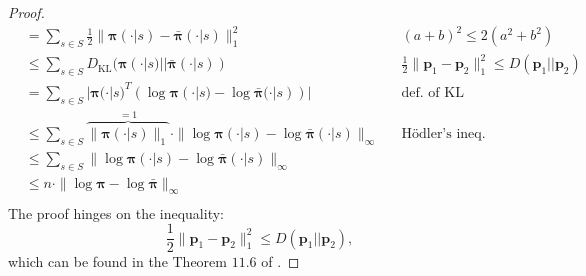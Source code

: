 \begin{claim}
\begin{proof}
\begin{align*}
            & = \sum_{s\in S} \frac{1}{2} \| \bm{\pi} (\cdot|s) 
            - \bar{\bm{\pi}} (\cdot|s) \|_1^2 
            && (a+b)^2 \leq 2(a^2+b^2) \\
            & \leq \sum_{s\in S} D_\text{KL}( \bm{\pi} (\cdot|s) 
            || \bar{\bm{\pi}} (\cdot|s) )
            && \frac{1}{2} \|\bm{p}_1 - \bm{p}_2 \|_1^2 \leq D(\bm{p}_1||\bm{p}_2) \\
            & = \sum_{s\in S} | \bm{\pi}(\cdot|s)^T (  \log \bm{\pi}(\cdot|s) - \log \bar{\bm{\pi}}(\cdot|s) )  |
            && \text{def. of KL}\\
            & \leq \sum_{s\in S} 
            \overbrace{\| \bm{\pi} (\cdot|s) \|_1 }^{=1}
            \cdot \|  \log \bm{\pi} (\cdot|s) - \log \bar{\bm{\pi}} (\cdot|s) \|_\infty  
            && \text{Hödler's ineq.}\\
            & \leq \sum_{s\in S} 
             \|  \log \bm{\pi} (\cdot|s) - \log \bar{\bm{\pi}} (\cdot|s) \|_\infty  
            && \\
            & \leq 
            n \cdot
             \|  \log \bm{\pi} - \log \bar{\bm{\pi}} \|_\infty  
            && \\
        \end{align*}
        The proof hinges on the inequality:
        \[ \frac{1}{2} \|\bm{p}_1 - \bm{p}_2 \|_1^2 \leq D(\bm{p}_1||\bm{p}_2), \]
        which can be found in the Theorem $11.6$ of \cite{Cover2006}.
    \end{proof}
\end{claim}

